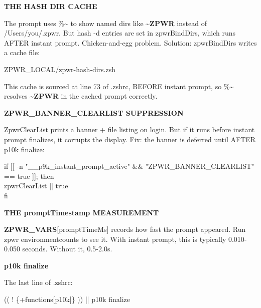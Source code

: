 \documentclass[11pt,a4paper,twoside]{book}
\begin{document}
\vspace{12pt}
{\bfseries\color{neonyellow} THE HASH DIR CACHE}\vspace{4pt}

The prompt uses \%\textasciitilde{} to show named dirs like \textasciitilde{}\textbf{ZPWR} instead of /Users/you/.zpwr. But hash -d entries are set in zpwrBindDirs, which runs AFTER instant prompt. Chicken-and-egg problem. Solution: zpwrBindDirs writes a cache file:

\begin{codebox}
\color{neongreen}ZPWR\_LOCAL/zpwr-hash-dirs.zsh\\
\end{codebox}

This cache is sourced at line 73 of .zshrc, BEFORE instant prompt, so \%\textasciitilde{} resolves \textasciitilde{}\textbf{ZPWR} in the cached prompt correctly.


\vspace{12pt}
{\bfseries\color{neonyellow} \textbf{ZPWR\_BANNER}\_CLEARLIST SUPPRESSION}\vspace{4pt}

ZpwrClearList prints a banner + file listing on login. But if it runs before instant prompt finalizes, it corrupts the display. Fix: the banner is deferred until AFTER p10k finalize:

\begin{codebox}
\color{neongreen}if [[ -n "\_\_p9k\_instant\_prompt\_active" \&\& "ZPWR\_BANNER\_CLEARLIST" == true ]]; then\\
\color{neongreen}zpwrClearList || true\\
\color{neongreen}fi\\
\end{codebox}


\vspace{12pt}
{\bfseries\color{neonyellow} THE promptTimestamp MEASUREMENT}\vspace{4pt}

\textbf{ZPWR\_VARS}[promptTimeMs] records how fast the prompt appeared. Run zpwr environmentcounts to see it. With instant prompt, this is typically 0.010-0.050 seconds. Without it, 0.5-2.0s.


\vspace{12pt}
{\bfseries\color{neonyellow} p10k finalize}\vspace{4pt}

The last line of .zshrc:

\begin{codebox}
\color{neongreen}(( ! \{+functions[p10k]\} )) || p10k finalize\\
\end{codebox}
\end{document}
